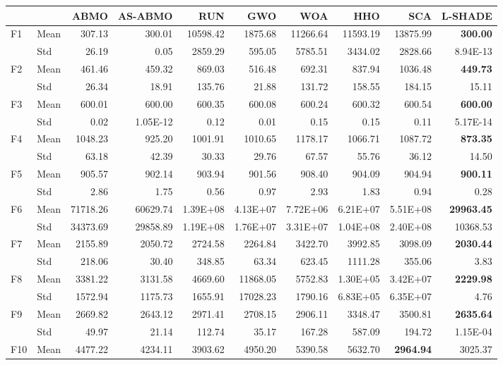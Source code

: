 \begin{tabular}{@{}llrrrrrrrr@{}}
\toprule
 & & ABMO & AS-ABMO & RUN & GWO & WOA & HHO & SCA & L-SHADE \\
\midrule
F1 & Mean & 307.13 & 300.01 & 10598.42 & 1875.68 & 11266.64 & 11593.19 & 13875.99 & \textbf{300.00} \\
 & Std & 26.19 & 0.05 & 2859.29 & 595.05 & 5785.51 & 3434.02 & 2828.66 & 8.94E-13 \\
F2 & Mean & 461.46 & 459.32 & 869.03 & 516.48 & 692.31 & 837.94 & 1036.48 & \textbf{449.73} \\
 & Std & 26.34 & 18.91 & 135.76 & 21.88 & 131.72 & 158.55 & 184.15 & 15.11 \\
F3 & Mean & 600.01 & 600.00 & 600.35 & 600.08 & 600.24 & 600.32 & 600.54 & \textbf{600.00} \\
 & Std & 0.02 & 1.05E-12 & 0.12 & 0.01 & 0.15 & 0.15 & 0.11 & 5.17E-14 \\
F4 & Mean & 1048.23 & 925.20 & 1001.91 & 1010.65 & 1178.17 & 1066.71 & 1087.72 & \textbf{873.35} \\
 & Std & 63.18 & 42.39 & 30.33 & 29.76 & 67.57 & 55.76 & 36.12 & 14.50 \\
F5 & Mean & 905.57 & 902.14 & 903.94 & 901.56 & 908.40 & 904.09 & 904.94 & \textbf{900.11} \\
 & Std & 2.86 & 1.75 & 0.56 & 0.97 & 2.93 & 1.83 & 0.94 & 0.28 \\
F6 & Mean & 71718.26 & 60629.74 & 1.39E+08 & 4.13E+07 & 7.72E+06 & 6.21E+07 & 5.51E+08 & \textbf{29963.45} \\
 & Std & 34373.69 & 29858.89 & 1.19E+08 & 1.76E+07 & 3.31E+07 & 1.04E+08 & 2.40E+08 & 10368.53 \\
F7 & Mean & 2155.89 & 2050.72 & 2724.58 & 2264.84 & 3422.70 & 3992.85 & 3098.09 & \textbf{2030.44} \\
 & Std & 218.06 & 30.40 & 348.85 & 63.34 & 623.45 & 1111.28 & 355.06 & 3.83 \\
F8 & Mean & 3381.22 & 3131.58 & 4669.60 & 11868.05 & 5752.83 & 1.30E+05 & 3.42E+07 & \textbf{2229.98} \\
 & Std & 1572.94 & 1175.73 & 1655.91 & 17028.23 & 1790.16 & 6.83E+05 & 6.35E+07 & 4.76 \\
F9 & Mean & 2669.82 & 2643.12 & 2971.41 & 2708.15 & 2906.11 & 3348.47 & 3500.81 & \textbf{2635.64} \\
 & Std & 49.97 & 21.14 & 112.74 & 35.17 & 167.28 & 587.09 & 194.72 & 1.15E-04 \\
F10 & Mean & 4477.22 & 4234.11 & 3903.62 & 4950.20 & 5390.58 & 5632.70 & \textbf{2964.94} & 3025.37 \\

\end{tabular}
